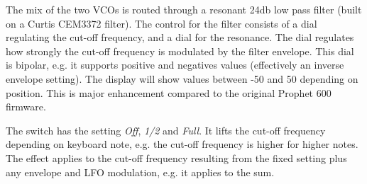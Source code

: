 The mix of the two VCOs is routed through a resonant 24db low pass filter (built on a Curtis CEM3372 filter). The control for the filter consists of a \filtercutoff dial regulating the cut-off frequency, and a \filterres dial for the resonance. The \filterenv dial regulates how strongly the cut-off frequency is modulated by the filter envelope. This dial is bipolar, e.g. it supports positive and negatives values (effectively an inverse envelope setting). The display will show values between -50 and 50 depending on position. This is major enhancement compared to the original Prophet 600 firmware.

\begin{center}
\end{center}

The \keyboardtrack switch has the setting \textit{Off}, \textit{1/2} and \textit{Full}. It lifts the cut-off frequency depending on keyboard note, e.g. the cut-off frequency is higher for higher notes. The effect applies to the cut-off frequency resulting from the fixed \filtercutoff setting plus any envelope and LFO modulation, e.g. it applies to the sum.  
